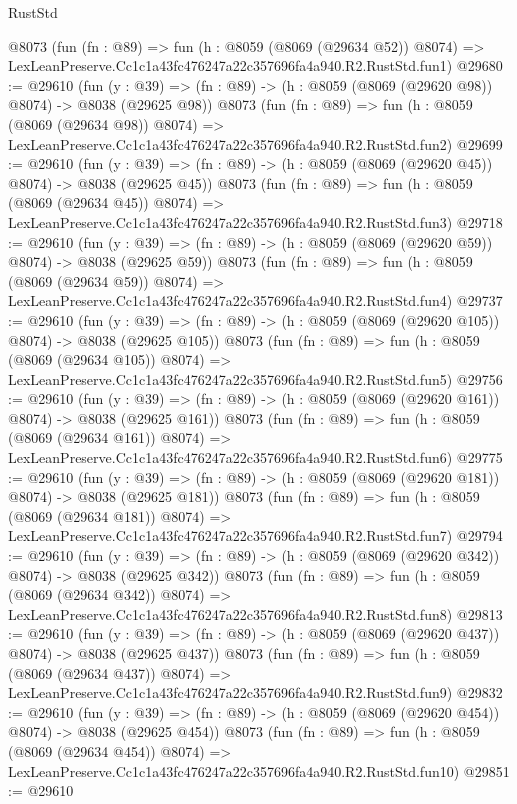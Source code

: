 \begin{lexlean}{RustStd}
\begin{coremodule}
    @8073
    (fun (fn : @89) =>
    fun (h : @8059 (@8069 (@29634 @52)) @8074) =>
    LexLeanPreserve.Cc1c1a43fc476247a22c357696fa4a940.R2.RustStd.fun1)
@29680 := @29610
    (fun (y : @39) => (fn : @89) -> (h : @8059 (@8069 (@29620 @98)) @8074) -> @8038 (@29625 @98))
    @8073
    (fun (fn : @89) =>
    fun (h : @8059 (@8069 (@29634 @98)) @8074) =>
    LexLeanPreserve.Cc1c1a43fc476247a22c357696fa4a940.R2.RustStd.fun2)
@29699 := @29610
    (fun (y : @39) => (fn : @89) -> (h : @8059 (@8069 (@29620 @45)) @8074) -> @8038 (@29625 @45))
    @8073
    (fun (fn : @89) =>
    fun (h : @8059 (@8069 (@29634 @45)) @8074) =>
    LexLeanPreserve.Cc1c1a43fc476247a22c357696fa4a940.R2.RustStd.fun3)
@29718 := @29610
    (fun (y : @39) => (fn : @89) -> (h : @8059 (@8069 (@29620 @59)) @8074) -> @8038 (@29625 @59))
    @8073
    (fun (fn : @89) =>
    fun (h : @8059 (@8069 (@29634 @59)) @8074) =>
    LexLeanPreserve.Cc1c1a43fc476247a22c357696fa4a940.R2.RustStd.fun4)
@29737 := @29610
    (fun (y : @39) => (fn : @89) -> (h : @8059 (@8069 (@29620 @105)) @8074) -> @8038 (@29625 @105))
    @8073
    (fun (fn : @89) =>
    fun (h : @8059 (@8069 (@29634 @105)) @8074) =>
    LexLeanPreserve.Cc1c1a43fc476247a22c357696fa4a940.R2.RustStd.fun5)
@29756 := @29610
    (fun (y : @39) => (fn : @89) -> (h : @8059 (@8069 (@29620 @161)) @8074) -> @8038 (@29625 @161))
    @8073
    (fun (fn : @89) =>
    fun (h : @8059 (@8069 (@29634 @161)) @8074) =>
    LexLeanPreserve.Cc1c1a43fc476247a22c357696fa4a940.R2.RustStd.fun6)
@29775 := @29610
    (fun (y : @39) => (fn : @89) -> (h : @8059 (@8069 (@29620 @181)) @8074) -> @8038 (@29625 @181))
    @8073
    (fun (fn : @89) =>
    fun (h : @8059 (@8069 (@29634 @181)) @8074) =>
    LexLeanPreserve.Cc1c1a43fc476247a22c357696fa4a940.R2.RustStd.fun7)
@29794 := @29610
    (fun (y : @39) => (fn : @89) -> (h : @8059 (@8069 (@29620 @342)) @8074) -> @8038 (@29625 @342))
    @8073
    (fun (fn : @89) =>
    fun (h : @8059 (@8069 (@29634 @342)) @8074) =>
    LexLeanPreserve.Cc1c1a43fc476247a22c357696fa4a940.R2.RustStd.fun8)
@29813 := @29610
    (fun (y : @39) => (fn : @89) -> (h : @8059 (@8069 (@29620 @437)) @8074) -> @8038 (@29625 @437))
    @8073
    (fun (fn : @89) =>
    fun (h : @8059 (@8069 (@29634 @437)) @8074) =>
    LexLeanPreserve.Cc1c1a43fc476247a22c357696fa4a940.R2.RustStd.fun9)
@29832 := @29610
    (fun (y : @39) => (fn : @89) -> (h : @8059 (@8069 (@29620 @454)) @8074) -> @8038 (@29625 @454))
    @8073
    (fun (fn : @89) =>
    fun (h : @8059 (@8069 (@29634 @454)) @8074) =>
    LexLeanPreserve.Cc1c1a43fc476247a22c357696fa4a940.R2.RustStd.fun10)
@29851 := @29610

\end{coremodule}
\end{lexlean}
